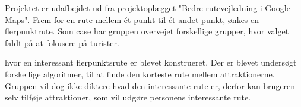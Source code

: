 Projektet er udafbejdet ud fra projektoplægget "Bedre rutevejledning i Google Maps". Frem for en rute mellem ét punkt til ét andet punkt, ønkes en flerpunktrute. Som case har gruppen overvejet forskellige grupper, hvor valget faldt på at fokusere på turister.

hvor en interessant flerpunktsrute er blevet konstrueret. Der er blevet undersøgt forskellige algoritmer, til at finde den korteste rute mellem attraktionerne. Gruppen vil dog ikke diktere hvad den interessante rute er, derfor kan brugeren selv tilføje attraktioner, som vil udgøre personens interessante rute. 
